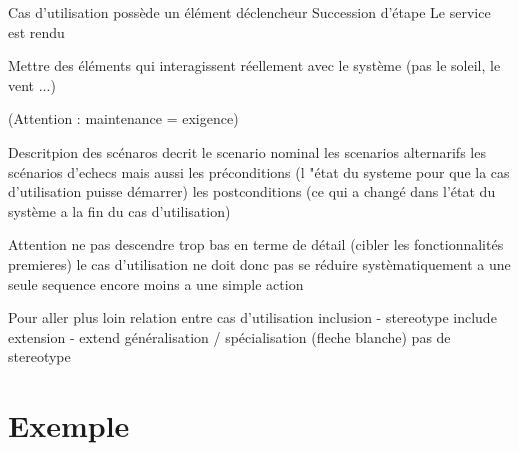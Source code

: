 \documentclass[11pt,oneside]{article}
\begin{document}
Cas d'utilisation possède un élément déclencheur
Succession d'étape
Le service est rendu

Mettre des éléments qui interagissent réellement avec le système (pas le soleil, le vent ...)




(Attention : maintenance = exigence)


Descritpion des scénaros
decrit le scenario nominal
les scenarios alternarifs
les scénarios d'echecs
mais aussi les préconditions (l "état du systeme pour que la cas d'utilisation puisse démarrer)
les postconditions (ce qui a changé dans l'état du système a la fin du cas d'utilisation)


Attention
ne pas descendre trop bas en terme de détail (cibler les fonctionnalités premieres)
le cas d'utilisation ne doit donc pas se réduire systèmatiquement a une seule sequence
encore moins a une simple action


Pour aller plus loin
relation entre cas d'utilisation
inclusion - stereotype include
extension - extend
généralisation / spécialisation (fleche blanche) pas de stereotype

\section{Exemple}

\begin{thebibliography}{2}

\end{thebibliography}
\end{document}
